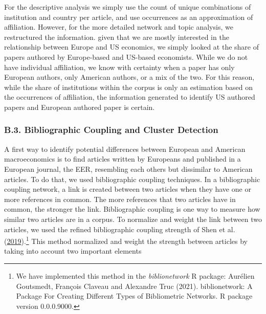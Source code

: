 \documentclass[
]{article}
\begin{document}
For the descriptive analysis we simply use the count of unique
combinations of institution and country per article, and use occurrences
as an approximation of affiliation. However, for the more detailed
network and topic analysis, we restructured the information. given that
we are mostly interested in the relationship between Europe and US
economics, we simply looked at the share of papers authored by
Europe-based and US-based economists. While we do not have individual
affiliation, we know with certainty when a paper has only European
authors, only American authors, or a mix of the two. For this reason,
while the share of institutions within the corpus is only an estimation
based on the occurrences of affiliation, the information generated to
identify US authored papers and European authored paper is certain.

\hypertarget{network}{%
\subsubsection*{B.3. Bibliographic Coupling and Cluster
Detection}\label{network}}

A first way to identify potential differences between European and
American macroeconomics is to find articles written by Europeans and
published in a European journal, the EER, resembling each others but
dissimilar to American articles. To do that, we used bibliographic
coupling techniques. In a bibliographic coupling network, a link is
created between two articles when they have one or more references in
common. The more references that two articles have in common, the
stronger the link. Bibliographic coupling is one way to measure how
similar two articles are in a corpus. To normalize and weight the link
between two articles, we used the refined bibliographic coupling
strength of Shen et al.
(\protect\hyperlink{ref-shen2019}{2019}).\footnote{We have implemented
  this method in the \emph{biblionetwork} R package: Aurélien Goutsmedt,
  François Claveau and Alexandre Truc (2021). biblionetwork: A Package
  For Creating Different Types of Bibliometric Networks. R package
  version 0.0.0.9000.} This method normalized and weight the strength
between articles by taking into account two important elements
\end{document}
